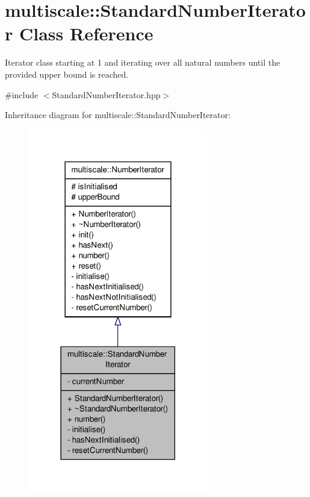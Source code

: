 \hypertarget{classmultiscale_1_1StandardNumberIterator}{\section{multiscale\-:\-:Standard\-Number\-Iterator Class Reference}
\label{classmultiscale_1_1StandardNumberIterator}
}


Iterator class starting at 1 and iterating over all natural numbers until the provided upper bound is reached.  




{\ttfamily \#include $<$Standard\-Number\-Iterator.\-hpp$>$}



Inheritance diagram for multiscale\-:\-:Standard\-Number\-Iterator\-:
\nopagebreak
\begin{figure}[H]
\begin{center}
\leavevmode
\includegraphics[width=222pt]{classmultiscale_1_1StandardNumberIterator__inherit__graph}
\end{center}
\end{figure}


